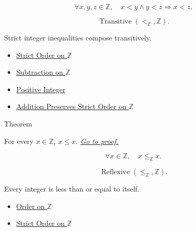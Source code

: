 \begin{remark*}
\[
\forall x,y,z\in\mathbb{Z},\quad
x<y\land y<z \Longrightarrow x<z.
\]
\end{remark*}

\begin{remark*}
\[
\operatorname{Transitive}(<_{\mathbb{Z}},\mathbb{Z}).
\]
\end{remark*}

\begin{remark*}[Interpretation]
Strict integer inequalities compose transitively.
\end{remark*}

\begin{dependencies}
\begin{itemize}
  \item \hyperref[def:strict-order-on-z]{Strict Order on $\mathbb{Z}$}
  \item \hyperref[def:subtraction-on-z]{Subtraction on $\mathbb{Z}$}
  \item \hyperref[def:positive-integer]{Positive Integer}
  \item \hyperref[thm:addition-preserves-strict-order-on-z]{Addition Preserves Strict Order on $\mathbb{Z}$}
\end{itemize}
\end{dependencies}

\begin{theorembox}{Theorem}
\begin{theorem}
\label{thm:order-on-z-reflexive}
For every $x\in\mathbb{Z}$, $x\le x$.
\hyperref[prf:order-on-z-reflexive]{\textit{Go to proof.}}
\end{theorem}
\end{theorembox}

\begin{remark*}
\[
\forall x\in\mathbb{Z},\quad x\le_{\mathbb{Z}}x.
\]
\end{remark*}

\begin{remark*}
\[
\operatorname{Reflexive}(\le_{\mathbb{Z}},\mathbb{Z}).
\]
\end{remark*}

\begin{remark*}[Interpretation]
Every integer is less than or equal to itself.
\end{remark*}

\begin{dependencies}
\begin{itemize}
  \item \hyperref[def:order-on-z]{Order on $\mathbb{Z}$}
  \item \hyperref[def:strict-order-on-z]{Strict Order on $\mathbb{Z}$}
\end{itemize}
\end{dependencies}

